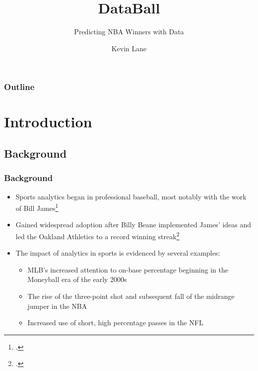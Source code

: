 \documentclass{beamer}
\title{DataBall}
\subtitle{Predicting NBA Winners with Data}
\author{Kevin Lane}
\begin{document}
\begin{frame}
\titlepage
\end{frame}

\begin{frame}
\frametitle{Outline}
\tableofcontents
\end{frame}

\section{Introduction}

\subsection{Background}
\begin{frame}
\frametitle{Background}
\begin{itemize}
    \item Sports analytics began in professional baseball, most notably with the work of Bill James\footcite{james}
    \item Gained widespread adoption after Billy Beane implemented James' ideas and led the Oakland Athletics to a record winning streak\footcite{lewis}
    \item The impact of analytics in sports is evidenced by several examples:
    \begin{itemize}
        \item MLB's increased attention to on-base percentage beginning in the Moneyball era of the early 2000s
        \item The rise of the three-point shot and subsequent fall of the midrange jumper in the NBA
        \item Increased use of short, high percentage passes in the NFL
    \end{itemize}
\end{itemize}
\end{frame}
\end{document}
